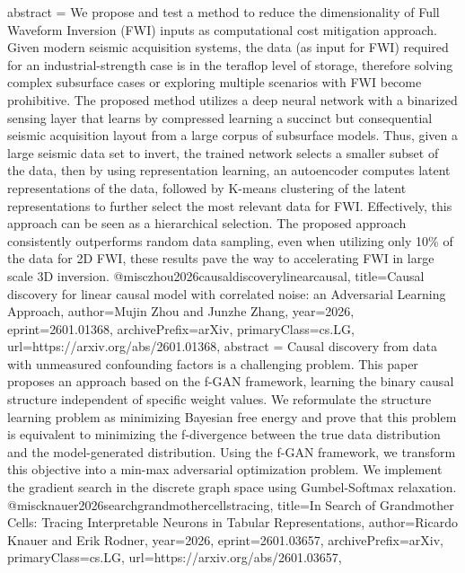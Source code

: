 {      abstract = {We propose and test a method to reduce the dimensionality of Full Waveform Inversion (FWI) inputs as computational cost mitigation approach. Given modern seismic acquisition systems, the data (as input for FWI) required for an industrial-strength case is in the teraflop level of storage, therefore solving complex subsurface cases or exploring multiple scenarios with FWI become prohibitive. The proposed method utilizes a deep neural network with a binarized sensing layer that learns by compressed learning a succinct but consequential seismic acquisition layout from a large corpus of subsurface models. Thus, given a large seismic data set to invert, the trained network selects a smaller subset of the data, then by using representation learning, an autoencoder computes latent representations of the data, followed by K-means clustering of the latent representations to further select the most relevant data for FWI. Effectively, this approach can be seen as a hierarchical selection. The proposed approach consistently outperforms random data sampling, even when utilizing only 10\% of the data for 2D FWI, these results pave the way to accelerating FWI in large scale 3D inversion.}
}@misc{zhou2026causaldiscoverylinearcausal,
      title={Causal discovery for linear causal model with correlated noise: an Adversarial Learning Approach}, 
      author={Mujin Zhou and Junzhe Zhang},
      year={2026},
      eprint={2601.01368},
      archivePrefix={arXiv},
      primaryClass={cs.LG},
      url={https://arxiv.org/abs/2601.01368},
      abstract = {Causal discovery from data with unmeasured confounding factors is a challenging problem. This paper proposes an approach based on the f-GAN framework, learning the binary causal structure independent of specific weight values. We reformulate the structure learning problem as minimizing Bayesian free energy and prove that this problem is equivalent to minimizing the f-divergence between the true data distribution and the model-generated distribution. Using the f-GAN framework, we transform this objective into a min-max adversarial optimization problem. We implement the gradient search in the discrete graph space using Gumbel-Softmax relaxation.}
}@misc{knauer2026searchgrandmothercellstracing,
      title={In Search of Grandmother Cells: Tracing Interpretable Neurons in Tabular Representations}, 
      author={Ricardo Knauer and Erik Rodner},
      year={2026},
      eprint={2601.03657},
      archivePrefix={arXiv},
      primaryClass={cs.LG},
      url={https://arxiv.org/abs/2601.03657},
}
